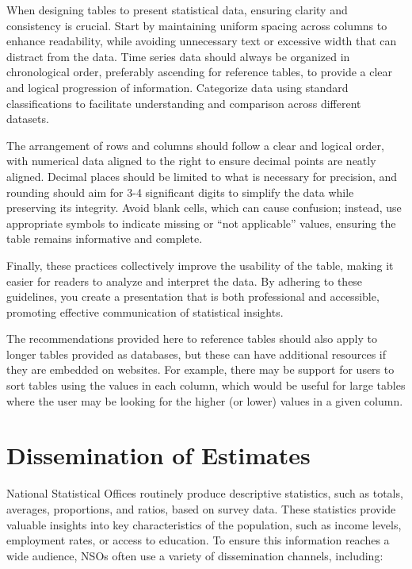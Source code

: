 \documentclass[
  12pt,
]{book}
\begin{document}
When designing tables to present statistical data, ensuring clarity and consistency is crucial. Start by maintaining uniform spacing across columns to enhance readability, while avoiding unnecessary text or excessive width that can distract from the data. Time series data should always be organized in chronological order, preferably ascending for reference tables, to provide a clear and logical progression of information. Categorize data using standard classifications to facilitate understanding and comparison across different datasets.

The arrangement of rows and columns should follow a clear and logical order, with numerical data aligned to the right to ensure decimal points are neatly aligned. Decimal places should be limited to what is necessary for precision, and rounding should aim for 3-4 significant digits to simplify the data while preserving its integrity. Avoid blank cells, which can cause confusion; instead, use appropriate symbols to indicate missing or ``not applicable'' values, ensuring the table remains informative and complete.

Finally, these practices collectively improve the usability of the table, making it easier for readers to analyze and interpret the data. By adhering to these guidelines, you create a presentation that is both professional and accessible, promoting effective communication of statistical insights.

The recommendations provided here to reference tables should also apply to longer tables provided as databases, but these can have additional resources if they are embedded on websites. For example, there may be support for users to sort tables using the values in each column, which would be useful for large tables where the user may be looking for the higher (or lower) values in a given column.

\hypertarget{dissemination-of-estimates}{%
\section{Dissemination of Estimates}\label{dissemination-of-estimates}}

National Statistical Offices routinely produce descriptive statistics, such as totals, averages, proportions, and ratios, based on survey data. These statistics provide valuable insights into key characteristics of the population, such as income levels, employment rates, or access to education. To ensure this information reaches a wide audience, NSOs often use a variety of dissemination channels, including:
\end{document}
